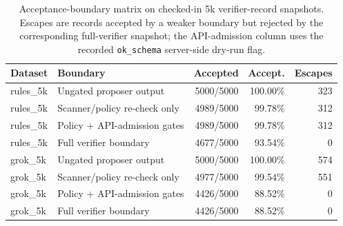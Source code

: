 \begin{table}[t]
\centering
\scriptsize
\caption{Acceptance-boundary matrix on checked-in 5k verifier-record snapshots. Escapes are records accepted by a weaker boundary but rejected by the corresponding full-verifier snapshot; the API-admission column uses the recorded \texttt{ok\_schema} server-side dry-run flag.}
\label{tab:verifier_ablation}
\begin{tabular}{@{}l l r r r@{}}
\toprule
\textbf{Dataset} & \textbf{Boundary} & \textbf{Accepted} & \textbf{Accept.} & \textbf{Escapes} \\
\midrule
rules\_5k & Ungated proposer output & 5000/5000 & 100.00\% & 323 \\
rules\_5k & Scanner/policy re-check only & 4989/5000 & 99.78\% & 312 \\
rules\_5k & Policy + API-admission gates & 4989/5000 & 99.78\% & 312 \\
rules\_5k & Full verifier boundary & 4677/5000 & 93.54\% & 0 \\
\midrule
grok\_5k & Ungated proposer output & 5000/5000 & 100.00\% & 574 \\
grok\_5k & Scanner/policy re-check only & 4977/5000 & 99.54\% & 551 \\
grok\_5k & Policy + API-admission gates & 4426/5000 & 88.52\% & 0 \\
grok\_5k & Full verifier boundary & 4426/5000 & 88.52\% & 0 \\
\bottomrule
\end{tabular}
\end{table}
